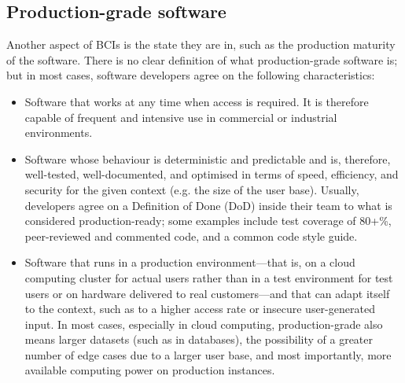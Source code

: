 \subsection{Production-grade software}
\label{chapter2-production-grade-software}

Another aspect of BCIs is the state they are in, such as the production maturity of the software. There is no clear definition of what production-grade software is; but in most cases, software developers agree on the following characteristics:

\begin{itemize}
  \item Software that works at any time when access is required. It is therefore capable of frequent and intensive use in commercial or industrial environments.
  \item Software whose behaviour is deterministic and predictable and is, therefore, well-tested, well-documented, and optimised in terms of speed, efficiency, and security for the given context (e.g. the size of the user base). Usually, developers agree on a Definition of Done (DoD) inside their team to what is considered production-ready; some examples include test coverage of 80+\%, peer-reviewed and commented code, and a common code style guide.
  \item Software that runs in a production environment—that is, on a cloud computing cluster for actual users rather than in a test environment for test users or on hardware delivered to real customers—and that can adapt itself to the context, such as to a higher access rate or insecure user-generated input. In most cases, especially in cloud computing, production-grade also means larger datasets (such as in databases), the possibility of a greater number of edge cases due to a larger user base, and most importantly, more available computing power on production instances.
\end{itemize}

